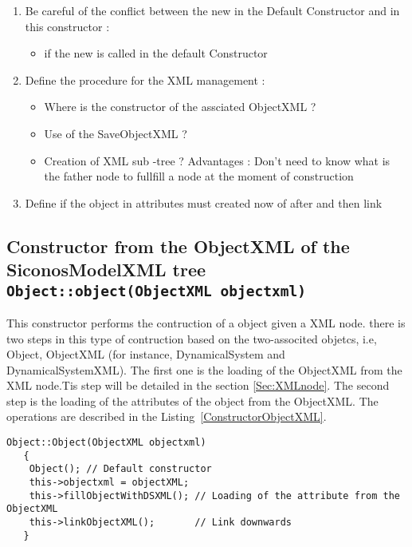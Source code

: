  \begin{ndr}
   \begin{enumerate}
   \item Be careful of the conflict between the new in the Default Constructor and in this constructor :
     \begin{itemize}
     \item if the new is called in the default Constructor
     \end{itemize}
   \item Define the procedure for the XML management :
     \begin{itemize}
     \item  Where  is the constructor of the assciated ObjectXML ? 
     \item  Use of the SaveObjectXML ?
     \item  Creation of XML sub -tree ? Advantages : Don't need to know what is the father node to fullfill a node at the moment of construction
     \end{itemize}
   \item Define if the object in attributes must created now of after and then link
   \end{enumerate}
 \end{ndr}


\subsection{Constructor from the ObjectXML of the SiconosModelXML tree {\small \tt Object::object(ObjectXML objectxml) }}

This constructor performs  the contruction of a object given a XML node. there is two steps in this type of contruction  based on the two-associted objetcs, i.e, Object, ObjectXML (for instance, DynamicalSystem and DynamicalSystemXML). The first one is the loading of the ObjectXML from the XML node.Tis step will be detailed in the section \ref{Sec:XMLnode}. The second  step is the loading of the attributes of the object from the ObjectXML. The operations are described in the Listing~\ref{ConstructorObjectXML}.

\begin{lstlisting}[frame=single,caption={Constructor from the ObjectXML of the SiconosModelXML tree }, label={ConstructorObjectXML}]
Object::Object(ObjectXML objectxml)
   {
    Object(); // Default constructor
    this->objectxml = objectXML;        
    this->fillObjectWithDSXML(); // Loading of the attribute from the ObjectXML
    this->linkObjectXML();       // Link downwards
   }
\end{lstlisting} 



